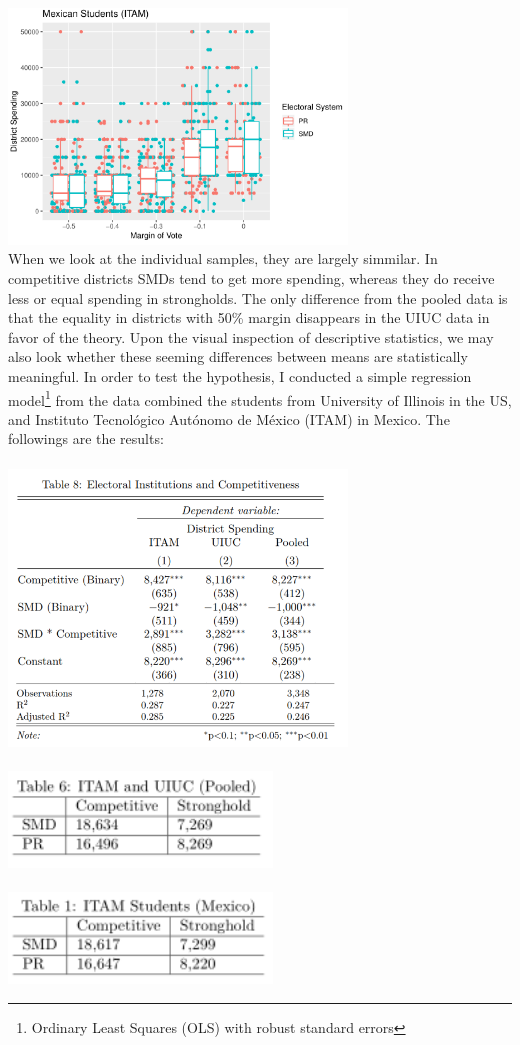 \documentclass{article}
\begin{document}
\includegraphics[width=90mm]{Boxplot_ITAM}\\
When we look at the individual samples, they are largely simmilar. In competitive districts SMDs tend to get more spending, whereas they do receive less or equal spending in strongholds. The only difference from the pooled data is that the equality in districts with 50\% margin disappears in the UIUC data in favor of the theory. Upon the visual inspection of descriptive statistics, we may also look whether these seeming differences between means are statistically meaningful. In order to test the hypothesis, I conducted a simple regression model\footnote{Ordinary Least Squares (OLS) with robust standard errors} from the data combined the students from University of Illinois in the US, and Instituto Tecnol\'{o}gico Aut\'{o}nomo de M\'{e}xico (ITAM) in Mexico. The followings are the results:\\
\\
\includegraphics[width=90mm]{Regressions_All}\\
\\
\includegraphics[width=70mm]{Coefficients_Pooled}\\
\\
\includegraphics[width=70mm]{Coefficients_ITAM}\\
\end{document}
